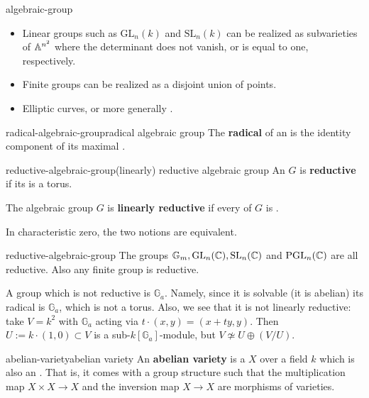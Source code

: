 \begin{example}{algebraic-group}
    \begin{itemize}
        \item Linear groups such as $\text{GL}_n(k)$ and $\text{SL}_n(k)$ can be realized as subvarieties of $\AA^{n^2}$ where the determinant does not vanish, or is equal to one, respectively.
        \item Finite groups can be realized as a disjoint union of points.
        \item Elliptic curves, or more generally .
    \end{itemize}
\end{example}

\begin{topic}{radical-algebraic-group}{radical algebraic group}
    The \textbf{radical} of an  is the identity component of its maximal   .
\end{topic}

\begin{topic}{reductive-algebraic-group}{(linearly) reductive algebraic group}
    An  $G$ is \textbf{reductive} if its  is a torus.
    
    The algebraic group $G$ is \textbf{linearly reductive} if every  of $G$ is .
    
    In characteristic zero, the two notions are equivalent.
\end{topic}

\begin{example}{reductive-algebraic-group}
    The groups $\mathbb{G}_m, \text{GL}_n(\CC), \text{SL}_n(\CC)$ and $\text{PGL}_n(\CC)$ are all reductive. Also any finite group is reductive.
    
    A group which is not reductive is $\mathbb{G}_a$. Namely, since it is solvable (it is abelian) its radical is $\mathbb{G}_a$, which is not a torus. Also, we see that it is not linearly reductive: take $V = k^2$ with $\mathbb{G}_a$ acting via $t \cdot (x, y) = (x + ty, y)$. Then $U := k \cdot (1, 0) \subset V$ is a sub-$k[\mathbb{G}_a]$-module, but $V \not\simeq U \oplus (V / U)$.
\end{example}

\begin{topic}{abelian-variety}{abelian variety}
    An \textbf{abelian variety} is a   $X$ over a field $k$ which is also an . That is, it comes with a group structure such that the multiplication map $X \times X \to X$ and the inversion map $X \to X$ are morphisms of varieties.
\end{topic}

